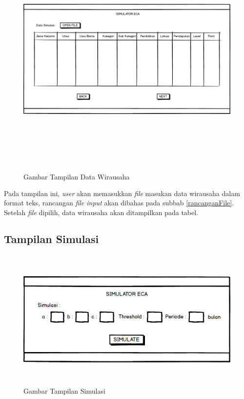 \begin{figure} [H]
	\centering  
	\includegraphics[width=16cm, height=12cm]{mockup4-1} 
	\caption[Gambar Tampilan Data Wirausaha]{Gambar Tampilan Data Wirausaha}
	\label{fig:kondisiDataWirausaha} 
\end{figure}

Pada tampilan ini, \textit{user} akan memasukkan \textit{file} masukan data wirausaha dalam format teks, rancangan \textit{file input} akan dibahas pada subbab \ref{rancanganFile}. Setelah \textit{file} dipilih, data wirausaha akan ditampilkan pada tabel.
\subsection{Tampilan Simulasi}

\begin{figure} [H]
	\centering  
	\includegraphics[width=12cm, height=7cm]{mockup5} 
	\caption[Gambar Tampilan Simulasi]{Gambar Tampilan Simulasi}
	\label{fig:simulasi} 
\end{figure}

